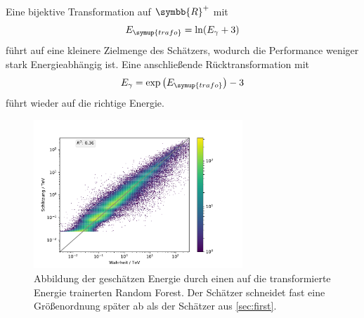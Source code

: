 Eine bijektive Transformation auf $\symbb{R}^+$ mit
\begin{equation}
  E_{\symup{trafo}}=\ln(E_\gamma +3)
  \label{eqn:trafo}
\end{equation}
führt auf eine kleinere Zielmenge des Schätzers, wodurch die Performance weniger stark Energieabhängig ist.
Eine anschließende Rücktransformation mit
\begin{equation}
  E_\gamma = \exp \left(E_{\symup{trafo}}\right)-3
\end{equation}
führt wieder auf die richtige Energie.
\begin{figure}
  \includegraphics[width=0.7\textwidth]{Plots/trafo_encaps.pdf}
  \centering
  \caption{Abbildung der geschätzen Energie durch einen auf die transformierte Energie trainerten Random Forest. Der Schätzer schneidet fast eine Größenordnung
          später ab als der Schätzer aus \autoref{sec:first}.}
  \label{abb:Energie_trafo}
\end{figure}


